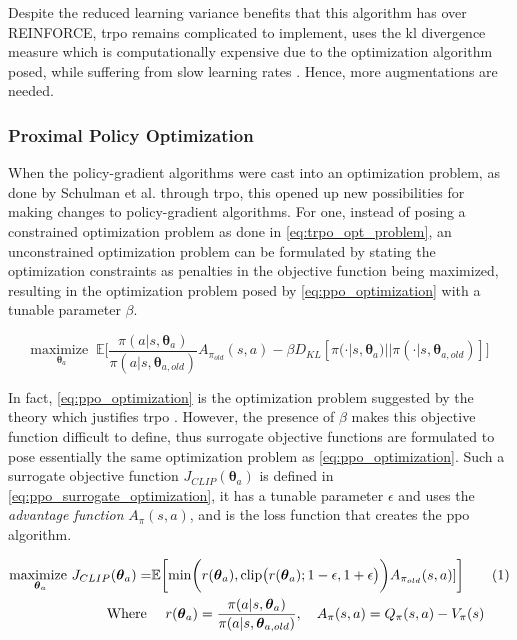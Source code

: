 \documentclass[../report.tex]{subfiles}
\begin{document}
Despite the reduced learning variance benefits that this algorithm has over REINFORCE, \ac{trpo} remains complicated to implement, uses the \ac{kl} divergence measure which is computationally expensive due to the optimization algorithm posed, while suffering from slow learning rates \cite{ppo}. Hence, more augmentations are needed.

\subsubsection{Proximal Policy Optimization}

When the policy-gradient algorithms were cast into an optimization problem, as done by Schulman et al. through \ac{trpo}, this opened up new possibilities for making changes to policy-gradient algorithms. For one, instead of posing a constrained optimization problem as done in \autoref{eq:trpo_opt_problem}, an unconstrained optimization problem can be formulated by stating the optimization constraints as penalties in the objective function being maximized, resulting in the optimization problem posed by \autoref{eq:ppo_optimization} with a tunable parameter $\beta$.

{\myfont
\begin{equation}\label{eq:ppo_optimization}
    \underset{\boldsymbol{\theta}_a}{\text{maximize }} \ \mathbb{E} \bigg[\frac{\pi(a|s,\boldsymbol{\theta}_a)}{\pi(a|s, \boldsymbol{\theta}_{a,old})} A_{\pi_{old}}(s,a) - \beta D_{KL} [\pi(\cdot | s, \boldsymbol{\theta}_a) || \pi(\cdot |s, \boldsymbol{\theta}_{a, old})]\bigg] 
\end{equation}
}

In fact, \autoref{eq:ppo_optimization} is the optimization problem suggested by the theory which justifies \ac{trpo} \cite{ppo}. However, the presence of $\beta$ makes this objective function difficult to define, thus surrogate objective functions are formulated to pose essentially the same optimization problem as \autoref{eq:ppo_optimization}. Such a surrogate objective function $J_{CLIP}(\boldsymbol{\theta}_a)$ is defined in \autoref{eq:ppo_surrogate_optimization}, it has a tunable parameter $\epsilon$ and uses the \textit{advantage function} $A_{\pi}(s,a)$, and is the loss function that creates the \ac{ppo} algorithm.

{\myfont
\begin{align*}
        \underset{\boldsymbol{\theta}_a}{\text{maximize }} J_{CLIP}(\boldsymbol{\theta}_a) = &\mathbb{E} \bigg[\text{min}\bigg( r(\boldsymbol{\theta}_a), \text{clip}\big(r(\boldsymbol{\theta}_a); 1-\epsilon, 1+\epsilon\big)\bigg) A_{\pi_{old}}(s,a)]\bigg] \stepcounter{equation}\tag{\theequation}\label{eq:ppo_surrogate_optimization}\\
        \text{Where } &\quad r(\boldsymbol{\theta}_a) = \frac{\pi(a|s,\boldsymbol{\theta}_a)}{\pi(a|s, \boldsymbol{\theta}_{a,old})} , \quad A_{\pi}(s,a) = Q_{\pi}(s,a) - V_{\pi}(s)
\end{align*}
}
\end{document}
